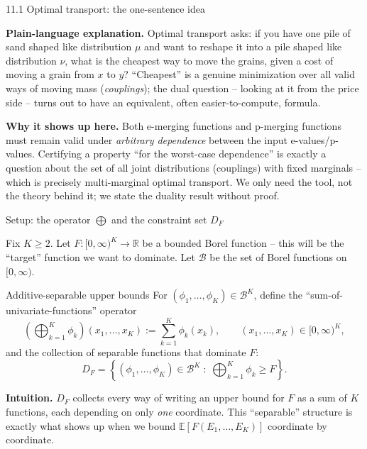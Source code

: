 \documentclass[aspectratio=169,10pt]{beamer}
\newcommand{\EE}{\mathbb{E}}
\newcommand{\RR}{\mathbb{R}}
\newcommand{\1}{\mathbb{1}}
\begin{document}
\begin{frame}[allowframebreaks]{11.1 Optimal transport: the one-sentence idea}

\textbf{Plain-language explanation.} Optimal transport asks: if you have one pile of sand shaped like distribution $\mu$ and want to reshape it into a pile shaped like distribution $\nu$, what is the cheapest way to move the grains, given a cost of moving a grain from $x$ to $y$? ``Cheapest'' is a genuine minimization over all valid ways of moving mass (\emph{couplings}); the dual question -- looking at it from the price side -- turns out to have an equivalent, often easier-to-compute, formula.

\vspace{2mm}
\textbf{Why it shows up here.} Both e-merging functions and p-merging functions must remain valid under \emph{arbitrary dependence} between the input e-values/p-values. Certifying a property ``for the worst-case dependence'' is exactly a question about the set of all joint distributions (couplings) with fixed marginals -- which is precisely multi-marginal optimal transport. We only need the tool, not the theory behind it; we state the duality result without proof.

\end{frame}

\begin{frame}[allowframebreaks]{Setup: the operator $\bigoplus$ and the constraint set $D_F$}

Fix $K \ge 2$. Let $F:[0,\infty)^K \to \RR$ be a bounded Borel function -- this will be the ``target'' function we want to dominate. Let $\mathcal{B}$ be the set of Borel functions on $[0,\infty)$.

\begin{block}{Additive-separable upper bounds}
For $(\phi_1,\dots,\phi_K) \in \mathcal{B}^K$, define the ``sum-of-univariate-functions'' operator
\[
\left(\bigoplus_{k=1}^K \phi_k\right)(x_1,\dots,x_K) := \sum_{k=1}^K \phi_k(x_k), \qquad (x_1,\dots,x_K) \in [0,\infty)^K,
\]
and the collection of separable functions that dominate $F$:
\[
D_F = \left\{ (\phi_1,\dots,\phi_K) \in \mathcal{B}^K \;:\; \bigoplus_{k=1}^K \phi_k \ge F \right\}.
\]
\end{block}

\textbf{Intuition.} $D_F$ collects every way of writing an upper bound for $F$ as a sum of $K$ functions, each depending on only \emph{one} coordinate. This ``separable'' structure is exactly what shows up when we bound $\EE[F(E_1,\dots,E_K)]$ coordinate by coordinate.

\end{frame}
\end{document}
